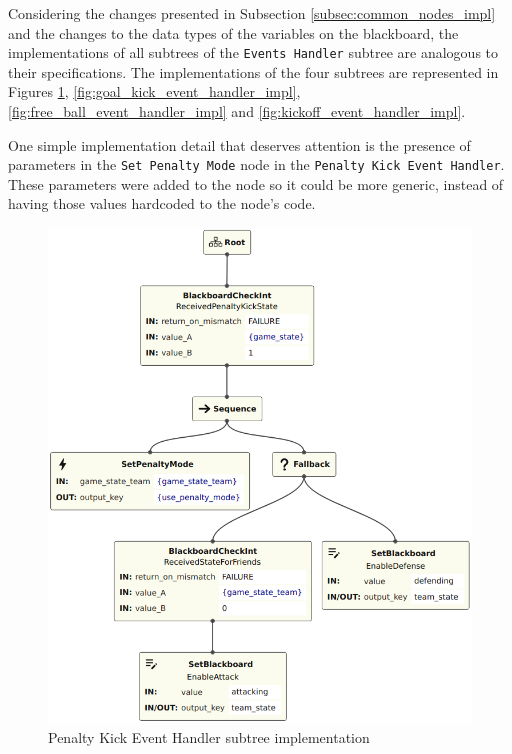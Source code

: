 Considering the changes presented in Subsection \ref{subsec:common_nodes_impl} and the changes to the data types of the variables on the blackboard, the implementations of all subtrees of the \texttt{Events Handler} subtree are analogous to their specifications. The implementations of the four subtrees are represented in Figures \ref{fig:penalty_kick_event_handler_impl}, \ref{fig:goal_kick_event_handler_impl}, \ref{fig:free_ball_event_handler_impl} and \ref{fig:kickoff_event_handler_impl}.

One simple implementation detail that deserves attention is the presence of parameters in the \texttt{Set Penalty Mode} node in the \texttt{Penalty Kick Event Handler}. These parameters were added to the node so it could be more generic, instead of having those values hardcoded to the node's code.

\begin{figure}[!h]
    \centering
    \includegraphics[width=0.7\linewidth]{images/implementation/PenaltyKickEventHandler.png}
    \caption{Penalty Kick Event Handler subtree implementation}
    \label{fig:penalty_kick_event_handler_impl}
\end{figure}

